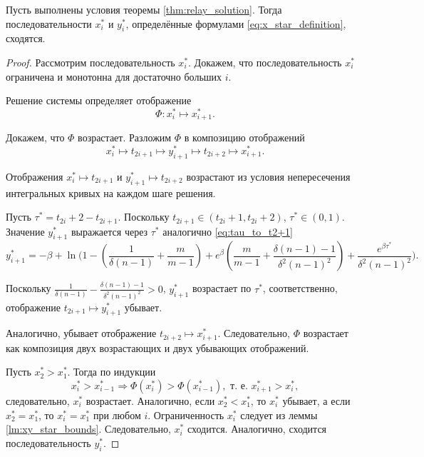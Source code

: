 \begin{lemma}
	\label{lm:convergence_x_star}
	Пусть выполнены условия теоремы \ref{thm:relay_solution}. Тогда последовательности $x^*_i$ и $y^*_i$, определённые формулами \eqref{eq:x_star_definition}, сходятся.
\end{lemma}
\begin{proof}
	
	Рассмотрим последовательность $x^*_i$. Докажем, что последовательность $x^*_i$ ограничена и монотонна для достаточно больших $i$.
	
	Решение системы определяет отображение
	\begin{equation}
		\label{eq:flow_relay}
		\Phi: x^*_i \mapsto x^*_{i + 1}.
	\end{equation}
	
	Докажем, что $\Phi$ возрастает. Разложим $\Phi$ в композицию отображений
	\begin{equation}
		x^*_i \mapsto t_{2i + 1} \mapsto y^*_{i + 1} \mapsto t_{2i + 2} \mapsto x^*_{i + 1}.
	\end{equation}
	
	Отображения $x^*_i \mapsto t_{2i + 1}$ и $y^*_{i + 1} \mapsto t_{2i + 2}$ возрастают из условия непересечения интегральных кривых на каждом шаге решения.
	
	Пусть $\tau^* = t_{2i} + 2 - t_{2i + 1} $. Поскольку $t_{2i + 1} \in (t_{2i} + 1, t_{2i} + 2)$, $\tau^* \in (0, 1)$. Значение $y^*_{i + 1}$ выражается через $\tau^*$ аналогично \eqref{eq:tau_to_t2+1}
	\footnotesize
	\[
	y^*_{i + 1} = -\beta + \ln\Bigg( 1 - \left(\frac{1}{\delta(n - 1)} + \frac{m}{m - 1}\right) +  e^{\beta} \left(\frac{m}{m - 1} + \frac{\delta(n - 1) - 1}{\delta^2 (n - 1)^2}\right) +  \frac{e^{\beta \tau^*}}{\delta^2 (n - 1)^2} \Bigg).
	\]
	\normalsize
	
	Поскольку $\frac{1}{\delta(n - 1)} - \frac{\delta(n - 1) - 1}{\delta^2 (n - 1)^2} > 0$, $y^*_{i + 1}$ возрастает по $\tau^*$, соответственно, отображение $t_{2i + 1} \mapsto y^*_{i + 1}$ убывает.
	
	Аналогично, убывает отображение $t_{2i + 2} \mapsto x^*_{i + 1}$. Следовательно, $\Phi$ возрастает как композиция двух возрастающих и двух убывающих отображений.
	
	Пусть $x^*_2 > x^*_1$. Тогда по индукции
	\[
	x^*_{i} > x^*_{i - 1} \Rightarrow \Phi(x^*_i) > \Phi(x^*_{i - 1}), \text{ т.~е. } x^*_{i + 1} > x^*_{i},
	\]
	следовательно, $x^*_i$ возрастает. Аналогично, если $x^*_2 < x^*_1$, то $x^*_i$ убывает, а если $x^*_2 = x^*_1$, то $x^*_i = x^*_1$ при любом $i$. Ограниченность $x^*_i$ следует из леммы \ref{lm:xy_star_bounds}. Следовательно, $x^*_i$ сходится. Аналогично, сходится последовательность $y^*_i$.
\end{proof}


